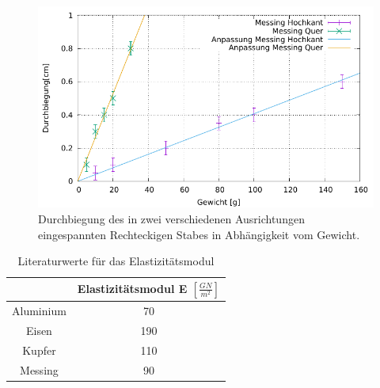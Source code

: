 \begin{figure}[h]
	\centering
	\includegraphics[width=1\textwidth]{res/Eckig.pdf}
	\caption{Durchbiegung des in zwei verschiedenen Ausrichtungen eingespannten Rechteckigen Stabes in Abhängigkeit vom Gewicht.}
	\label{fig:durchbiegungEckig}
\end{figure}


\begin{table}[h]
	\caption{Literaturwerte für das Elastizitätsmodul}
	\begin{tabular}{|c|c|}
		\hline
		& Elastizitätsmodul E $\left[\frac{GN}{m^2}\right]$\\
		\hline
		Aluminium & 70 \\
		\hline
		Eisen & 190 \\
		\hline
		Kupfer & 110 \\
		\hline
		Messing & 90 \\
		\hline
	\end{tabular}
\label{tab:ElaLit}
\end{table}
